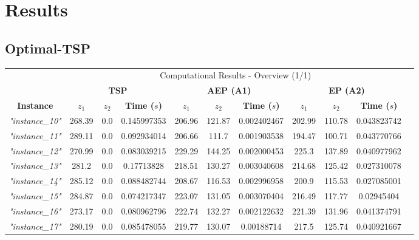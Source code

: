 \documentclass{article}
\begin{document}
\newpage

\section{Results}
\subsection{Optimal-TSP}

\renewcommand{\arraystretch}{1.4}
\begin{table}[H]
\begin{center}
\hspace{-10mm}\begin{tabular}{|c||c|c|c|c|c|c|c|c|c|c|}
\cline{2-10}
\multicolumn{1}{c|}{} & \multicolumn{9}{|c|}{\large{Computational Results - Overview (1/1)}} \\
\cline{2-10}
\multicolumn{1}{c|}{} & \multicolumn{3}{|c}{\textbf{TSP}} & \multicolumn{3}{|c}{\textbf{AEP (A1)}} & \multicolumn{3}{|c|}{\textbf{EP (A2)}} \\
\hline
\textbf{Instance} & \textbf{$z_1$} & \textbf{$z_2$} & \textbf{Time ($s$)} & \textbf{$z_1$} & \textbf{$z_2$} & \textbf{Time ($s$)} & \textbf{$z_1$} & \textbf{$z_2$} & \textbf{Time ($s$)}  \\
\hline
\hline
\textit{"instance\_10"} & 268.39 & 0.0 & 0.145997353 & 206.96 & 121.87 & 0.002402467 & 202.99 & 110.78 & 0.043823742 \\
\hline
\textit{"instance\_11"} & 289.11 & 0.0 & 0.092934014 & 206.66 & 111.7 & 0.001903538 & 194.47 & 100.71 & 0.043770766 \\
\hline
\textit{"instance\_12"} & 270.99 & 0.0 & 0.083039215 & 229.29 & 144.25 & 0.002000453 & 225.3 & 137.89 & 0.040977962 \\
\hline
\textit{"instance\_13"} & 281.2 & 0.0 & 0.17713828 & 218.51 & 130.27 & 0.003040608 & 214.68 & 125.42 & 0.027310078 \\
\hline
\textit{"instance\_14"} & 285.12 & 0.0 & 0.088482744 & 208.67 & 116.53 & 0.002996958 & 200.9 & 115.53 & 0.027085001 \\
\hline
\textit{"instance\_15"} & 284.87 & 0.0 & 0.074217347 & 223.07 & 131.05 & 0.003070404 & 216.49 & 117.77 & 0.02945404 \\
\hline
\textit{"instance\_16"} & 273.17 & 0.0 & 0.080962796 & 222.74 & 132.27 & 0.002122632 & 221.39 & 131.96 & 0.041374791 \\
\hline
\textit{"instance\_17"} & 280.19 & 0.0 & 0.085478055 & 219.77 & 130.07 & 0.00188714 & 217.5 & 125.74 & 0.040921667 \\

\end{tabular}
\end{center}
\end{table}
\end{document}
